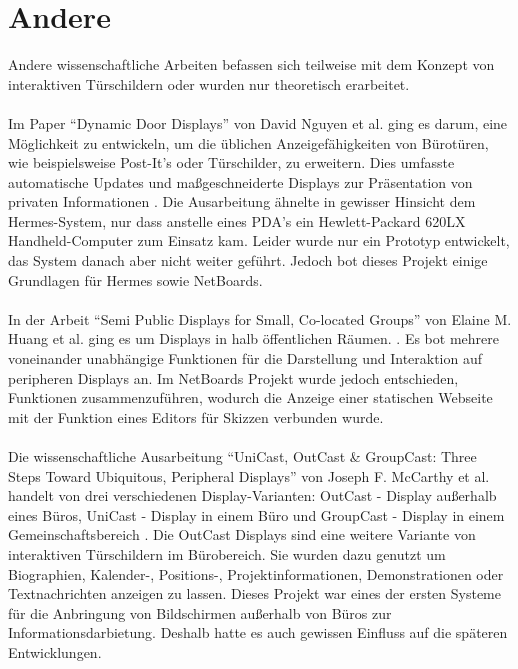 \section{Andere}
Andere wissenschaftliche Arbeiten befassen sich teilweise mit dem Konzept von interaktiven Türschildern oder wurden nur theoretisch erarbeitet.
\\\\
Im Paper ``Dynamic Door Displays'' von David Nguyen et al. ging es darum, eine Möglichkeit zu entwickeln, um die üblichen Anzeigefähigkeiten von Bürotüren, wie beispielsweise Post-It's oder Türschilder, zu erweitern. Dies umfasste automatische Updates und maßgeschneiderte Displays zur Präsentation von privaten Informationen \cite{nguyen:dyn-door-disp}. Die Ausarbeitung ähnelte in gewisser Hinsicht dem Hermes-System, nur dass anstelle eines PDA's ein Hewlett-Packard 620LX Handheld-Computer zum Einsatz kam.
Leider wurde nur ein Prototyp entwickelt, das System danach aber nicht weiter geführt. Jedoch bot dieses Projekt einige Grundlagen für Hermes sowie NetBoards.
\\\\
In der Arbeit ``Semi Public Displays for Small, Co-located Groups'' von Elaine M. Huang et al. ging es um Displays in halb öffentlichen Räumen. . Es bot mehrere voneinander unabhängige Funktionen für die Darstellung und Interaktion auf peripheren Displays an. Im NetBoards Projekt wurde jedoch entschieden, Funktionen zusammenzuführen, wodurch \bspw die Anzeige einer statischen Webseite mit der Funktion eines Editors für Skizzen verbunden wurde.
\\\\
Die wissenschaftliche Ausarbeitung ``UniCast, OutCast \& GroupCast: Three Steps Toward Ubiquitous, Peripheral Displays'' von Joseph F. McCarthy et al. handelt von drei verschiedenen Display-Varianten: OutCast - Display außerhalb eines Büros, UniCast - Display in einem Büro und GroupCast - Display in einem Gemeinschaftsbereich \cite{mccarthy:2001}. Die OutCast Displays sind eine weitere Variante von interaktiven Türschildern im Bürobereich. Sie wurden dazu genutzt um Biographien, Kalender-, Positions-, Projektinformationen, Demonstrationen oder Textnachrichten anzeigen zu lassen. Dieses Projekt war eines der ersten Systeme für die Anbringung von Bildschirmen außerhalb von Büros zur Informationsdarbietung. Deshalb hatte es auch gewissen Einfluss auf die späteren Entwicklungen.
